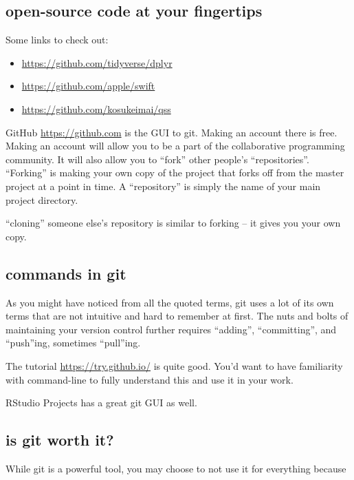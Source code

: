 \documentclass[]{book}
\providecommand{\tightlist}{%
  \setlength{\itemsep}{0pt}\setlength{\parskip}{0pt}}
\theoremstyle{definition}
\theoremstyle{definition}
\theoremstyle{definition}
\theoremstyle{remark}
\begin{document}
\subsection{open-source code at your
fingertips}\label{open-source-code-at-your-fingertips}

Some links to check out:

\begin{itemize}
\tightlist
\item
  \url{https://github.com/tidyverse/dplyr}
\item
  \url{https://github.com/apple/swift}
\item
  \url{https://github.com/kosukeimai/qss}
\end{itemize}

GitHub \url{https://github.com} is the GUI to git. Making an account
there is free. Making an account will allow you to be a part of the
collaborative programming community. It will also allow you to ``fork''
other people's ``repositories''. ``Forking'' is making your own copy of
the project that forks off from the master project at a point in time. A
``repository'' is simply the name of your main project directory.

``cloning'' someone else's repository is similar to forking -- it gives
you your own copy.

\subsection{commands in git}\label{commands-in-git}

As you might have noticed from all the quoted terms, git uses a lot of
its own terms that are not intuitive and hard to remember at first. The
nuts and bolts of maintaining your version control further requires
``adding'', ``committing'', and ``push''ing, sometimes ``pull''ing.

The tutorial \url{https://try.github.io/} is quite good. You'd want to
have familiarity with command-line to fully understand this and use it
in your work.

RStudio Projects has a great git GUI as well.

\subsection{is git worth it?}\label{is-git-worth-it}

While git is a powerful tool, you may choose to not use it for
everything because
\end{document}
